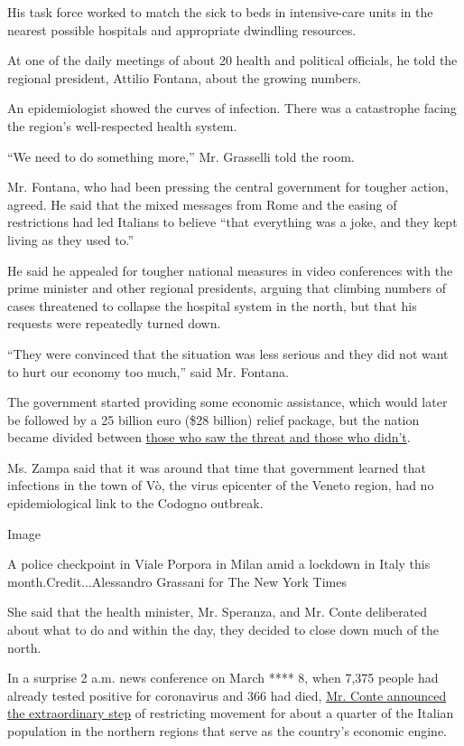 His task force worked to match the sick to beds in intensive-care units
in the nearest possible hospitals and appropriate dwindling resources.

At one of the daily meetings of about 20 health and political officials,
he told the regional president, Attilio Fontana, about the growing
numbers.

An epidemiologist showed the curves of infection. There was a
catastrophe facing the region's well-respected health system.

``We need to do something more,'' Mr. Grasselli told the room.

Mr. Fontana, who had been pressing the central government for tougher
action, agreed. He said that the mixed messages from Rome and the easing
of restrictions had led Italians to believe ``that everything was a
joke, and they kept living as they used to.''

He said he appealed for tougher national measures in video conferences
with the prime minister and other regional presidents, arguing that
climbing numbers of cases threatened to collapse the hospital system in
the north, but that his requests were repeatedly turned down.

``They were convinced that the situation was less serious and they did
not want to hurt our economy too much,'' said Mr. Fontana.

The government started providing some economic assistance, which would
later be followed by a 25 billion euro (\$28 billion) relief package,
but the nation became divided between
\href{https://www.nytimes3xbfgragh.onion/2020/02/28/world/europe/italy-coronavirus-quarantine.html?action=click\&module=RelatedLinks\&pgtype=Article}{those
who saw the threat and those who didn't}.

Ms. Zampa said that it was around that time that government learned that
infections in the town of Vò, the virus epicenter of the Veneto region,
had no epidemiological link to the Codogno outbreak.

Image

A police checkpoint in Viale Porpora in Milan amid a lockdown in Italy
this month.Credit...Alessandro Grassani for The New York Times

She said that the health minister, Mr. Speranza, and Mr. Conte
deliberated about what to do and within the day, they decided to close
down much of the north.

In a surprise 2 a.m. news conference on March **** 8, when 7,375 people
had already tested positive for coronavirus and 366 had died,
\href{https://www.nytimes3xbfgragh.onion/2020/03/07/world/europe/coronavirus-italy.html?action=click\&module=RelatedLinks\&pgtype=Article}{Mr.
Conte announced the extraordinary step} of restricting movement for
about a quarter of the Italian population in the northern regions that
serve as the country's economic engine.

